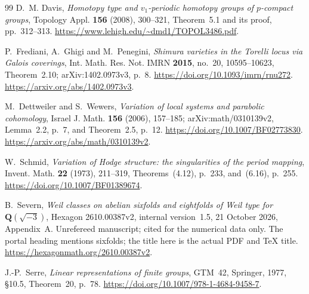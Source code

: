 \documentclass[11pt]{article}
\theoremstyle{definition}
\theoremstyle{remark}
\begin{document}
\begin{thebibliography}{99}
D.~M. Davis, \emph{Homotopy type and $v_1$-periodic homotopy groups of
$p$-compact groups}, Topology Appl. \textbf{156} (2008), 300--321,
Theorem~5.1 and its proof, pp.~312--313.
\url{https://www.lehigh.edu/~dmd1/TOPOL3486.pdf}.

P.~Frediani, A.~Ghigi and M.~Penegini, \emph{Shimura varieties in the
Torelli locus via Galois coverings}, Int. Math. Res. Not. IMRN
\textbf{2015}, no.~20, 10595--10623, Theorem~2.10;
arXiv:1402.0973v3, p.~8.
\url{https://doi.org/10.1093/imrn/rnu272}.
\url{https://arxiv.org/abs/1402.0973v3}.

M.~Dettweiler and S.~Wewers, \emph{Variation of local systems and
parabolic cohomology}, Israel J. Math. \textbf{156} (2006), 157--185;
arXiv:math/0310139v2, Lemma~2.2, p.~7, and Theorem~2.5, p.~12.
\url{https://doi.org/10.1007/BF02773830}.
\url{https://arxiv.org/abs/math/0310139v2}.

W.~Schmid, \emph{Variation of Hodge structure: the singularities of
the period mapping}, Invent. Math. \textbf{22} (1973), 211--319,
Theorems~(4.12), p.~233, and~(6.16), p.~255.
\url{https://doi.org/10.1007/BF01389674}.

B.~Severn, \emph{Weil classes on abelian sixfolds and eightfolds of
Weil type for $\mathbf Q(\sqrt{-3})$}, Hexagon 2610.00387v2,
internal version~1.5, 21 October 2026, Appendix~A.
Unrefereed manuscript; cited for the numerical data only.
The portal heading mentions sixfolds; the title here is the actual
PDF and TeX title.
\url{https://hexagonmath.org/2610.00387v2}.



 J.-P.~Serre,
\emph{Linear representations of finite groups}, GTM~42,
Springer, 1977, \S10.5, Theorem~20, p.~78.
\url{https://doi.org/10.1007/978-1-4684-9458-7}.

\end{thebibliography}
\end{document}
